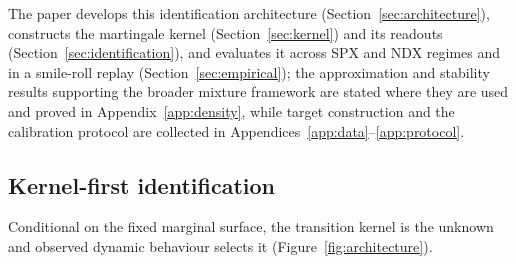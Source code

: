 \documentclass[11pt]{article}
\providecommand{\1}{\mathbf 1}
\begin{document}
The paper develops this identification architecture (Section~\ref{sec:architecture}), constructs the
martingale kernel (Section~\ref{sec:kernel}) and its readouts (Section~\ref{sec:identification}),
and evaluates it across SPX and NDX regimes and in a smile-roll replay (Section~\ref{sec:empirical}); the
approximation and stability results supporting the broader mixture framework are stated where they
are used and proved in Appendix~\ref{app:density}, while target construction and the calibration
protocol are collected in Appendices~\ref{app:data}--\ref{app:protocol}.

\subsection{Kernel-first identification}
\label{sec:kernelfirst}

Conditional on the fixed marginal surface, the transition kernel is the unknown and observed dynamic
behaviour selects it (Figure~\ref{fig:architecture}).
\end{document}
